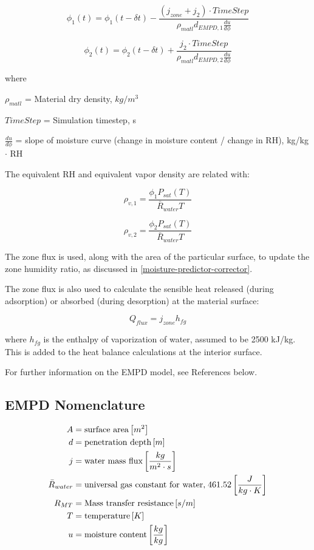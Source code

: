 \begin{equation}
\phi_{1}(t) = \phi_{1}(t-\delta t) - \frac { (j_{zone} + j_{2}) \cdot TimeStep} {\rho_{matl} d_{EMPD,1} \frac {du}{d\phi}}
\end{equation}

\begin{equation}
\phi_{2}(t) = \phi_{2}(t-\delta t) + \frac { j_{2} \cdot TimeStep} {\rho_{matl} d_{EMPD,2} \frac {du}{d\phi}}
\end{equation}

where

$\rho_{matl}$ = Material dry density, $kg/m^3$

$TimeStep$ = Simulation timestep, s

$\frac {du}{d\phi}$ = slope of moisture curve (change in moisture content / change in RH), kg/kg $\cdot$ RH

The equivalent RH and equivalent vapor density are related with:

\begin{equation}
\rho_{v,1} = \frac {\phi_{1} P_{sat}(T)} {\bar R_{water} T}
\end{equation}

\begin{equation}
\rho_{v,2} = \frac {\phi_{2} P_{sat}(T)} {\bar R_{water} T}
\end{equation}

The zone flux is used, along with the area of the particular surface, to update the zone humidity ratio, as discussed in \ref{moisture-predictor-corrector}.

The zone flux is also used to calculate the sensible heat released (during adsorption) or absorbed (during desorption) at the material surface:

\begin{equation}
Q_{flux} = j_{zone} h_{fg}
\end{equation}

where \(h_{fg}\) is the enthalpy of vaporization of water, assumed to be 2500 kJ/kg. This is added to the heat balance calculations at the interior surface.

For further information on the EMPD model, see References below.

\subsection{EMPD Nomenclature}\label{empd-nomenclature}
\begin{align*}  
  A  &= \text{surface area} \left[m^{2}\right] \\
  d &= \text{penetration depth} \left[m\right] \\
  j &= \text{water mass flux} \left[\frac{kg}{m^{2} \cdot s}\right] \\
  \bar R_{water} &= \text{universal gas constant for water,} \; 461.52 \left[\frac{J}{kg \cdot K}\right]   \\
  R_{MT} &= \text{Mass transfer resistance} \left[s/m\right] \\
  T &= \text{temperature} \left[K\right] \\
  u &= \text{moisture content} \left[\frac{kg}{kg}\right]
\end{align*}

